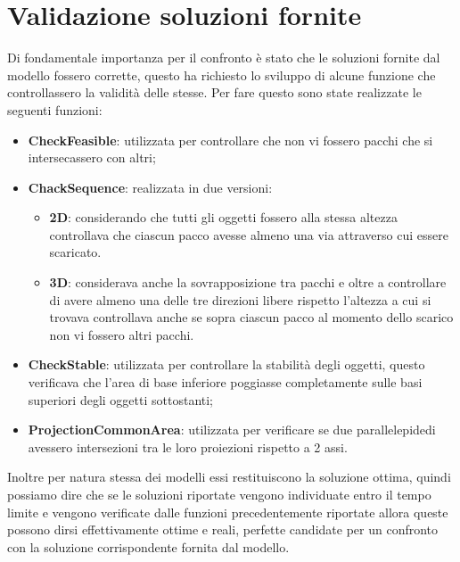 \section{Validazione soluzioni fornite}
Di fondamentale importanza per il confronto è stato che le soluzioni fornite dal modello fossero corrette, questo ha richiesto lo sviluppo di alcune funzione che controllassero la validità delle stesse. Per fare questo sono state realizzate le seguenti funzioni:
\begin{itemize}
	\item \textbf{CheckFeasible}: utilizzata per controllare che non vi fossero pacchi che si intersecassero con altri;
	\item \textbf{ChackSequence}: realizzata in due versioni:
	\begin{itemize}
		\item \textbf{2D}: considerando che tutti gli oggetti fossero alla stessa altezza controllava che ciascun pacco avesse almeno una via attraverso cui essere scaricato.
		\item \textbf{3D}: considerava anche la sovrapposizione tra pacchi e oltre a controllare di avere almeno una delle tre direzioni libere rispetto l'altezza a cui si trovava controllava anche se sopra ciascun pacco al momento dello scarico non vi fossero altri pacchi.
	\end{itemize}
	\item \textbf{CheckStable}: utilizzata per controllare la stabilità degli oggetti, questo verificava che l'area di base inferiore poggiasse completamente sulle basi superiori degli oggetti sottostanti;
	\item \textbf{ProjectionCommonArea}: utilizzata per verificare se due parallelepidedi avessero intersezioni tra le loro proiezioni rispetto a 2 assi.
\end{itemize}

Inoltre per natura stessa dei modelli essi restituiscono la soluzione ottima, quindi possiamo dire che se le soluzioni riportate vengono individuate entro il tempo limite e vengono verificate dalle funzioni precedentemente riportate allora queste possono dirsi effettivamente ottime e reali, perfette candidate per un confronto con la soluzione corrispondente fornita dal modello.